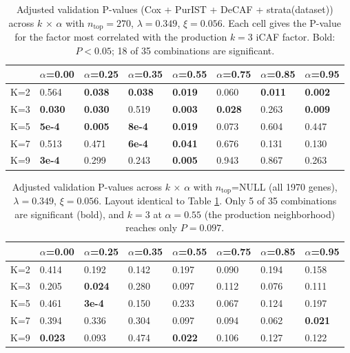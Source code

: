 \documentclass[
]{article}
\begin{document}
\begin{table}[!h]
\centering
\caption{\label{tab:tab-ksens-adjp-ntop270}Adjusted validation P-values (Cox + PurIST + DeCAF + strata(dataset)) across $k$ $\times$ $\alpha$ with $n_{\text{top}}=270$, $\lambda=0.349$, $\xi=0.056$. Each cell gives the P-value for the factor most correlated with the production $k = 3$ iCAF factor. Bold: $P < 0.05$; 18 of 35 combinations are significant.}
\centering
\fontsize{9}{11}\selectfont
\begin{tabular}[t]{llllllll}
\toprule
  & $\alpha$=0.00 & $\alpha$=0.25 & $\alpha$=0.35 & $\alpha$=0.55 & $\alpha$=0.75 & $\alpha$=0.85 & $\alpha$=0.95\\
\midrule
K=2 & 0.564 & \textbf{0.038} & \textbf{0.038} & \textbf{0.019} & 0.060 & \textbf{0.011} & \textbf{0.002}\\
K=3 & \textbf{0.030} & \textbf{0.030} & 0.519 & \textbf{0.003} & \textbf{0.028} & 0.263 & \textbf{0.009}\\
K=5 & \textbf{5e-4} & \textbf{0.005} & \textbf{8e-4} & \textbf{0.019} & 0.073 & 0.604 & 0.447\\
K=7 & 0.513 & 0.471 & \textbf{6e-4} & \textbf{0.041} & 0.676 & 0.131 & 0.130\\
K=9 & \textbf{3e-4} & 0.299 & 0.243 & \textbf{0.005} & 0.943 & 0.867 & 0.263\\
\bottomrule
\end{tabular}
\end{table}

\begin{table}[!h]
\centering
\caption{\label{tab:tab-ksens-adjp-allgenes}Adjusted validation P-values across $k$ $\times$ $\alpha$ with $n_{\text{top}}$=NULL (all 1970 genes), $\lambda=0.349$, $\xi=0.056$. Layout identical to Table \ref{tab:tab-ksens-adjp-ntop270}. Only 5 of 35 combinations are significant (bold), and $k = 3$ at $\alpha=0.55$ (the production neighborhood) reaches only $P = 0.097$.}
\centering
\fontsize{9}{11}\selectfont
\begin{tabular}[t]{llllllll}
\toprule
  & $\alpha$=0.00 & $\alpha$=0.25 & $\alpha$=0.35 & $\alpha$=0.55 & $\alpha$=0.75 & $\alpha$=0.85 & $\alpha$=0.95\\
\midrule
K=2 & 0.414 & 0.192 & 0.142 & 0.197 & 0.090 & 0.194 & 0.158\\
K=3 & 0.205 & \textbf{0.024} & 0.280 & 0.097 & 0.112 & 0.076 & 0.111\\
K=5 & 0.461 & \textbf{3e-4} & 0.150 & 0.233 & 0.067 & 0.124 & 0.197\\
K=7 & 0.394 & 0.336 & 0.304 & 0.097 & 0.094 & 0.062 & \textbf{0.021}\\
K=9 & \textbf{0.023} & 0.093 & 0.474 & \textbf{0.022} & 0.106 & 0.127 & 0.122\\
\bottomrule
\end{tabular}
\end{table}
\end{document}

